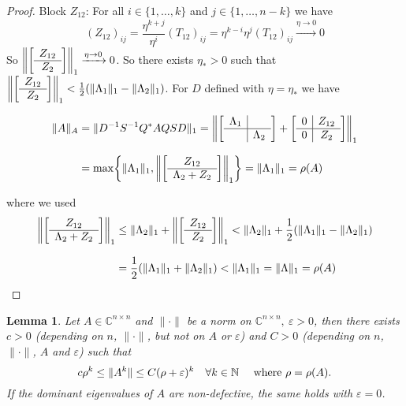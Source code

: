 \documentclass[12pt]{article}
\newtheorem{lemma}[theorem]{Lemma}
\theoremstyle{definition}
\theoremstyle{remark}
\numberwithin{equation}{section}
\newcommand{\C}{\mathbb{C}}
\newcommand{\N}{\mathbb{N}}
\newcommand{\normempty}{\|\cdot\|}
\newcommand{\blockVertical}[2]{
  \left[
    \begin{array}{c}
      #1\\\hline
      #2\\
    \end{array}
  \right]
}
\newcommand{\blockFull}[4]{
  \left[
    \begin{array}{c|c}
      #1 & #2\\\hline
      #3 & #4\\
    \end{array}
  \right]
}
\DeclarePairedDelimiter{\norm}{\lVert}{\rVert}
\DeclarePairedDelimiter{\set}{\{}{\}}
\begin{document}
\begin{proof}
  Block $Z_{12}$: For all $i \in \{1,\ldots,k\}$ and $j \in \{1,\ldots,n-k\}$ we have
  \begin{equation*}
    (Z_{12})_{ij} = \frac{\eta^{k+j}}{\eta^i} (T_{12})_{ij} = \eta^{k-i} \eta^{j} (T_{12})_{ij} \xrightarrow{\eta \rightarrow 0} 0
  \end{equation*}
  So $\norm*{\blockVertical{Z_{12}}{Z_2}}_1 \xrightarrow{\eta \rightarrow 0} 0$. So there exists $\eta_* > 0$ such that $\norm*{\blockVertical{Z_{12}}{Z_2}}_1 < \frac{1}{2}(\norm{\Lambda_1}_1 - \norm{\Lambda_2}_1)$. For $D$ defined with $\eta = \eta_*$ we have

  \begin{align*}
    \norm{A}_A &= \norm{D^{-1}S^{-1}Q^*AQSD}_1 = \norm*{\blockFull{\Lambda_1}{}{}{\Lambda_2} + \blockFull{0}{Z_{12}}{0}{Z_2}}_1 \\[0.5\baselineskip]
    &= \max\set*{{\norm{\Lambda_1}_1, \norm*{\blockVertical{Z_{12}}{\Lambda_2 + Z_2}}_1}} = \norm{\Lambda_1}_1 = \rho(A)
  \end{align*}

  where we used
  \begin{align*}
    \norm*{\blockVertical{Z_{12}}{\Lambda_2 + Z_2}}_1 &\leq \norm{\Lambda_2}_1 + \norm*{\blockVertical{Z_{12}}{Z_2}}_1 < \norm{\Lambda_2}_1 + \frac{1}{2}(\norm{\Lambda_1}_1 - \norm{\Lambda_2}_1) \\[0.5\baselineskip]
    &= \frac{1}{2}(\norm{\Lambda_1}_1 + \norm{\Lambda_2}_1) < \norm{\Lambda_1}_1 = \norm{\Lambda}_1=\rho(A)
  \end{align*}
\end{proof}

\begin{lemma}
  \label{lem:matrix-powers}
  Let $A \in \C^{n\times n}$ and $\normempty$ be a norm on $\C^{n\times n},\ \varepsilon>0$, then there exists $c>0$ (depending on $n$, $\normempty$, but not on $A$ or $\varepsilon$) and $C>0$ (depending on $n$, $\normempty$, $A$ and $\varepsilon$) such that
  \begin{equation*}
    c \rho^k \leq \norm{A^k} \leq C (\rho + \varepsilon)^k \quad \forall k \in \N \quad \text{  where $\rho = \rho(A)$.}
  \end{equation*}
  If the dominant eigenvalues of $A$ are non-defective, the same holds with $\varepsilon = 0$.
\end{lemma}
\end{document}
